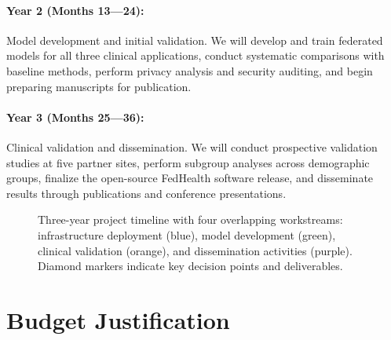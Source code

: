 \documentclass[12pt,letterpaper]{article}
\begin{document}
\paragraph{Year 2 (Months 13---24):} Model development and initial validation. We will develop and train federated models for all three clinical applications, conduct systematic comparisons with baseline methods, perform privacy analysis and security auditing, and begin preparing manuscripts for publication.

\paragraph{Year 3 (Months 25---36):} Clinical validation and dissemination. We will conduct prospective validation studies at five partner sites, perform subgroup analyses across demographic groups, finalize the open-source FedHealth software release, and disseminate results through publications and conference presentations.

\begin{figure}[H]
\centering
{}
\caption{Three-year project timeline with four overlapping workstreams: infrastructure deployment (blue), model development (green), clinical validation (orange), and dissemination activities (purple). Diamond markers indicate key decision points and deliverables.}
\label{fig:timeline}
\end{figure}

\section{Budget Justification}
\label{sec:budget}
\end{document}
